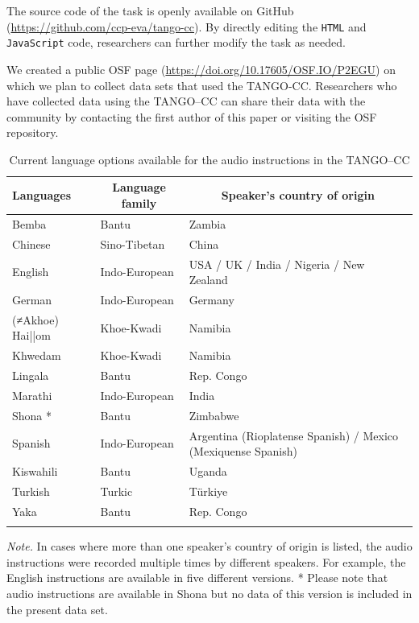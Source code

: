 \documentclass[
  man,floatsintext]{apa7}
\begin{document}
The source code of the task is openly available on GitHub (\url{https://github.com/ccp-eva/tango-cc}).
By directly editing the \texttt{HTML} and \texttt{JavaScript} code, researchers can further modify the task as needed.

We created a public OSF page (\url{https://doi.org/10.17605/OSF.IO/P2EGU}) on which we plan to collect data sets that used the TANGO-CC.
Researchers who have collected data using the TANGO--CC can share their data with the community by contacting the first author of this paper or visiting the OSF repository.

\begin{table}[tbp]

\begin{center}
\begin{threeparttable}

\caption{\label{tab:langtab}Current language options available for the audio instructions in the TANGO--CC}

\begin{tabular}{lll}
\toprule
Languages & \multicolumn{1}{c}{Language family} & \multicolumn{1}{c}{Speaker's country of origin}\\
\midrule
Bemba & Bantu & Zambia\\
Chinese & Sino-Tibetan & China\\
English & Indo-European & USA / UK / India / Nigeria / New Zealand\\
German & Indo-European & Germany\\
(≠Akhoe) Hai||om & Khoe-Kwadi & Namibia\\
Khwedam & Khoe-Kwadi & Namibia\\
Lingala & Bantu & Rep. Congo\\
Marathi & Indo-European & India\\
Shona * & Bantu & Zimbabwe\\
Spanish & Indo-European & Argentina (Rioplatense Spanish) / Mexico (Mexiquense Spanish)\\
Kiswahili & Bantu & Uganda\\
Turkish & Turkic & Türkiye\\
Yaka & Bantu & Rep. Congo\\
\bottomrule
\addlinespace
\end{tabular}

\begin{tablenotes}[para]
\normalsize{\textit{Note.} In cases where more than one speaker's country of origin is listed, the audio instructions were recorded multiple times by different speakers. For example, the English instructions are available in five different versions. * Please note that audio instructions are available in Shona but no data of this version is included in the present data set.}
\end{tablenotes}

\end{threeparttable}
\end{center}

\end{table}
\end{document}
